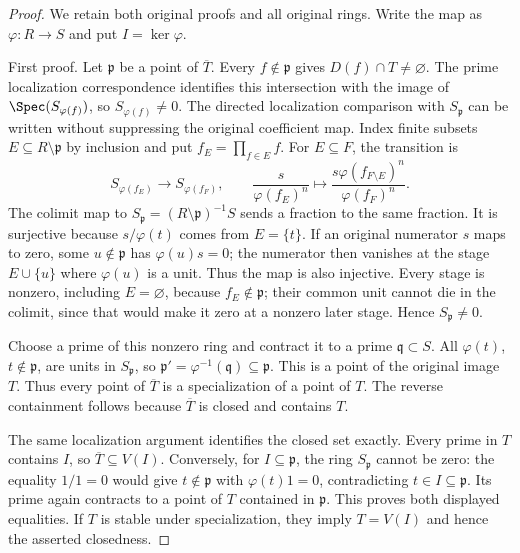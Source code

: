 \begin{proof}
We retain both original proofs and all original rings.
Write the map as $\varphi:R\to S$ and put $I=\ker\varphi$.

\medskip\noindent
First proof. Let $\mathfrak p$ be a point of $\overline T$.
Every $f\notin\mathfrak p$ gives $D(f)\cap T\ne\varnothing$.
The prime localization correspondence identifies this
intersection with the image of $\Spec(S_{\varphi(f)})$,
so $S_{\varphi(f)}\ne0$.
The directed localization comparison with $S_{\mathfrak p}$
can be written without suppressing the original coefficient map.
Index finite subsets $E\subseteq R\setminus\mathfrak p$
by inclusion and put $f_E=\prod_{f\in E}f$.
For $E\subseteq F$, the transition is
$$
S_{\varphi(f_E)}\longrightarrow S_{\varphi(f_F)},\qquad
\frac{s}{\varphi(f_E)^n}\longmapsto
\frac{s\varphi(f_{F\setminus E})^n}{\varphi(f_F)^n}.
$$
The colimit map to $S_{\mathfrak p}=(R\setminus\mathfrak p)^{-1}S$
sends a fraction to the same fraction. It is surjective
because $s/\varphi(t)$ comes from $E=\{t\}$.
If an original numerator $s$ maps to zero, some
$u\notin\mathfrak p$ has $\varphi(u)s=0$; the numerator
then vanishes at the stage $E\cup\{u\}$ where
$\varphi(u)$ is a unit. Thus the map is also injective.
Every stage is nonzero, including $E=\varnothing$,
because $f_E\notin\mathfrak p$; their common unit
cannot die in the colimit, since that would make it
zero at a nonzero later stage. Hence $S_{\mathfrak p}\ne0$.

Choose a prime of this nonzero ring and contract it
to a prime $\mathfrak q\subset S$. All
$\varphi(t)$, $t\notin\mathfrak p$, are units in
$S_{\mathfrak p}$, so
$\mathfrak p'=\varphi^{-1}(\mathfrak q)\subseteq\mathfrak p$.
This is a point of the original image $T$.
Thus every point of $\overline T$ is a specialization
of a point of $T$. The reverse containment follows
because $\overline T$ is closed and contains $T$.

The same localization argument identifies the closed set
exactly. Every prime in $T$ contains $I$, so
$\overline T\subseteq V(I)$. Conversely, for
$I\subseteq\mathfrak p$, the ring $S_{\mathfrak p}$
cannot be zero: the equality $1/1=0$ would give
$t\notin\mathfrak p$ with $\varphi(t)1=0$,
contradicting $t\in I\subseteq\mathfrak p$.
Its prime again contracts to a point of $T$ contained
in $\mathfrak p$. This proves both displayed equalities.
If $T$ is stable under specialization, they imply
$T=V(I)$ and hence the asserted closedness.


\end{proof}
